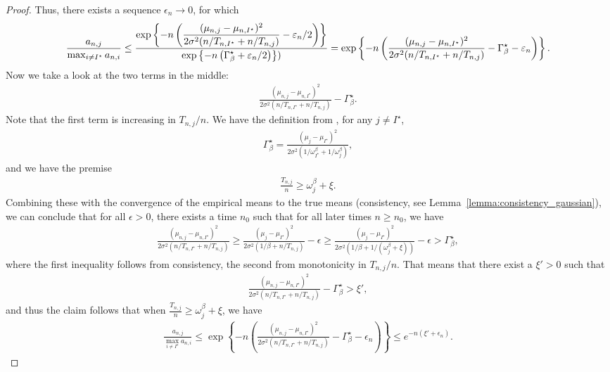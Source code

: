 \begin{proof}
	Thus, there exists a sequence $\epsilon_n \rightarrow 0$, for which 
	\begin{align*}
	    \frac{a_{n,j}}{\max_{i \neq I^\star} a_{n,i}} 
	    \leq \frac{\displaystyle \exp\left\{-n \left( \frac{ (\mu_{n,j} - \mu_{n,I^\star})^2}{2\sigma^2 (n/T_{n,I^\star} +n/T_{n,j})} - \varepsilon_n/2 \right) \right\}}{\displaystyle \exp\left\{-n \left( \Gamma_{\beta}^\star + \varepsilon_n/2 \right)\right\})}
	    = \exp\left\{-n \left(\frac{(\mu_{n,j} - \mu_{n,I^\star})^2}{2\sigma^2 (n/T_{n,I^\star} +n/T_{n,j})} - \Gamma_{\beta}^\star  - \varepsilon_n \right)\right\}.
	\end{align*}
	Now we take a look at the two terms in the middle:
	\begin{align*}
	\frac{(\mu_{n,j} - \mu_{n,I^\star})^2}{2\sigma^2 (n/T_{n,I^\star} +n/T_{n,j})} - \Gamma_{\beta}^\star.
	\end{align*}
	Note that the first term is increasing in $T_{n,j} / n$. We have the definition from \cite{qin2017ttei}, for any $j \neq I^\star$,
	\begin{align*}
	\Gamma_{\beta}^\star = \frac{(\mu_{j} - \mu_{I^\star})^2}{2\sigma^2 \left(1/ \omega_{I^\star}^\beta +1/\omega_j^\beta\right)}, 
	\end{align*}
	and we have the premise
	\begin{align*}
	\frac{T_{n,j}}{n} \geq \omega_j^\beta + \xi.
	\end{align*}
	Combining these with the convergence of the empirical means to the true means (consistency, see Lemma~\ref{lemma:consistency_gaussian}), we can conclude that for all $\epsilon > 0$, there exists a time $n_0$ such that for all later times $n \geq n_0$, we have
	\begin{align*}
	\frac{(\mu_{n,j} - \mu_{n,I^\star})^2}{2\sigma^2 (n/T_{n,I^\star} +n/T_{n,j})} \geq   \frac{(\mu_{j} - \mu_{I^\star})^2}{2\sigma^2 \left(1/\beta +n/T_{n,j} \right)} - \epsilon 
	\geq  \frac{(\mu_{j} - \mu_{I^\star})^2}{2\sigma^2 \left(1/\beta +1/(\omega_j^\beta + \xi)\right)} - \epsilon
	> \Gamma_{\beta}^\star,
	\end{align*}
	where the first inequality follows from consistency, the second from monotonicity in $T_{n,j} / n$. That means that there exist a $\xi' > 0$ such that
	\begin{align*}
	\frac{(\mu_{n,j} - \mu_{n,I^\star})^2}{2\sigma^2 (n/T_{n,I^\star} +n/T_{n,j})} - \Gamma_{\beta}^\star > \xi',
	\end{align*}
	and thus the claim follows that when $\frac{T_{n,j}}{n} \geq \omega_j^\beta + \xi$, we have
	\begin{align*}
	\frac{a_{n,j}}{\max_{i \neq I^\star} a_{n,i}} \leq \exp \left\lbrace - n \left(\frac{(\mu_{n,j} - \mu_{n,I^\star})^2}{2\sigma^2 (n/T_{n,I^\star} +n/T_{n,j})} - \Gamma_{\beta}^\star  - \epsilon_n \right) \right\rbrace 
	\leq e^{-n (\xi' + \epsilon_n)}.
	\end{align*}
\end{proof}


